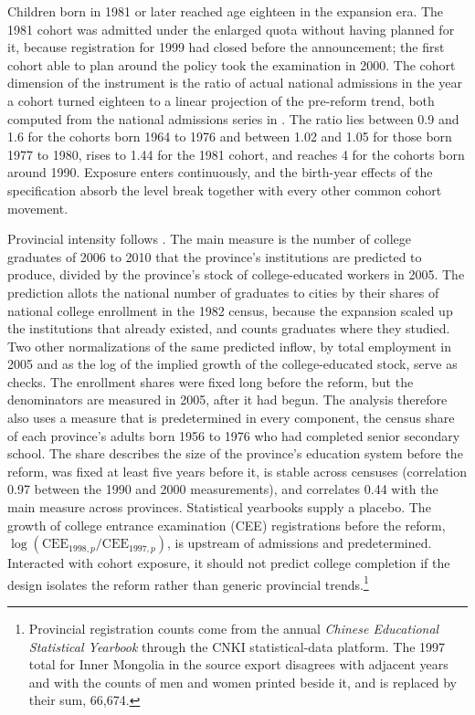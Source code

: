 \documentclass[11pt]{article}
\begin{document}
Children born in 1981 or later reached age eighteen in the expansion
era. The 1981 cohort was admitted under the enlarged quota without
having planned for it, because registration for 1999 had closed before
the announcement; the first cohort able to plan around the policy took
the examination in 2000. The cohort dimension of the instrument is the
ratio of actual national admissions in the year a cohort turned
eighteen to a linear projection of the pre-reform trend, both computed from the national admissions series in \citet{Ma2024IER}. The ratio lies between 0.9 and 1.6 for the cohorts born 1964 to 1976 and between 1.02 and 1.05 for those born 1977 to 1980, rises to 1.44 for the 1981 cohort, and reaches 4 for the cohorts born around 1990. Exposure enters
continuously, and the birth-year effects of the specification absorb
the level break together with every other common cohort movement.

Provincial intensity follows \citet{Ma2024IER}. The main measure is the
number of college graduates of 2006 to 2010 that the province's institutions are predicted to produce, divided by the province's
stock of college-educated workers in 2005. The prediction allots the national number of graduates to cities by their shares of national college enrollment in the 1982 census, because the expansion scaled up the institutions that already existed, and counts graduates where they studied. Two other normalizations of the same predicted inflow, by total employment in 2005 and as the log of the implied growth of the college-educated stock, serve as checks.
The enrollment shares were fixed long before the reform, but the denominators are measured in 2005, after it had begun. The analysis therefore also uses a
measure that is predetermined in every component, the census share of each province's
adults born 1956 to 1976 who had completed senior secondary school. The
share describes the size of the province's education system before the
reform, was fixed at least five years before it, is stable
across censuses (correlation 0.97 between the 1990 and 2000
measurements), and correlates 0.44 with the main measure across provinces. Statistical yearbooks supply a placebo.
The growth of college entrance examination (CEE) registrations before
the reform,
$\log(\mathrm{CEE}_{1998,p} / \mathrm{CEE}_{1997,p})$, is upstream of
admissions and predetermined. Interacted with cohort exposure, it should not predict college completion if the design isolates the reform rather than generic provincial trends.\footnote{Provincial registration counts come from the annual \emph{Chinese Educational Statistical Yearbook} through the CNKI statistical-data platform. The 1997 total for Inner Mongolia in the source export disagrees with adjacent years and with the counts of men and women printed beside it, and is replaced by their sum, 66{,}674.}
\end{document}
